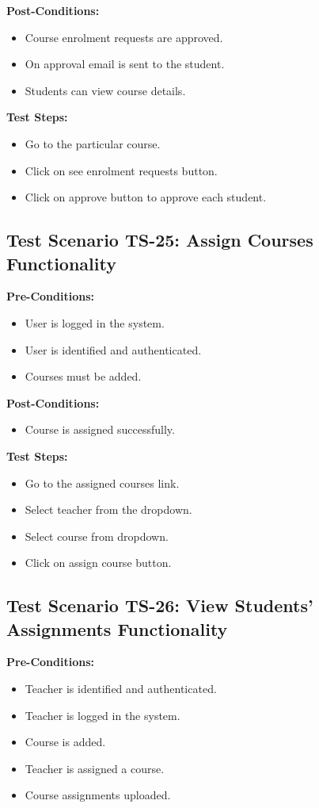 \textbf{Post-Conditions: }
\begin{itemize}
\item Course enrolment requests are approved.
\item On approval email is sent to the student.
\item Students can view course details.


\end{itemize}
\textbf{Test Steps:}
\begin{itemize}

\item Go to the particular course.
\item Click on see enrolment requests button.
\item Click on approve button to approve each student.

\end{itemize}


\subsection{Test Scenario TS-25: Assign Courses Functionality}
\textbf{Pre-Conditions: }
\begin{itemize}

\item User is logged in the system.
\item User is identified and authenticated.
\item Courses must be added.

\end{itemize}

\textbf{Post-Conditions: }
\begin{itemize}
\item Course is assigned successfully.

\end{itemize}
\textbf{Test Steps:}
\begin{itemize}

\item Go to the assigned courses link.
\item Select teacher from the dropdown.
\item Select course from dropdown.
\item Click on assign course button.

\end{itemize}



\subsection{Test Scenario TS-26: View Students' Assignments Functionality}
\textbf{Pre-Conditions: }
\begin{itemize}

\item Teacher is identified and authenticated.
\item Teacher is logged in the system.
\item Course is added.
\item Teacher is assigned a course.
\item Course assignments uploaded.

\end{itemize}

